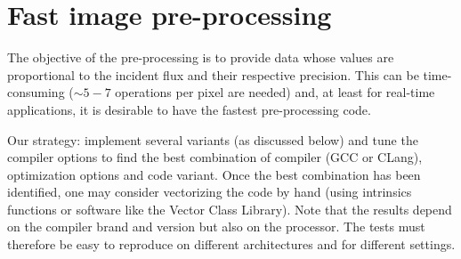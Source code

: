 \documentclass[10pt]{article}
\begin{document}
\section{Fast image pre-processing}

The objective of the pre-processing is to provide data whose values
are proportional to the incident flux and their respective precision.
This can be time-consuming ($\sim 5 - 7$ operations per pixel are
needed) and, at least for real-time applications, it is desirable to
have the fastest pre-processing code.

Our strategy: implement several variants (as discussed below) and tune
the compiler options to find the best combination of compiler (GCC or
CLang), optimization options and code variant.  Once the best
combination has been identified, one may consider vectorizing the code
by hand (using intrinsics functions or software like the Vector Class
Library).  Note that the results depend on the compiler brand and
version but also on the processor.  The tests must therefore be easy
to reproduce on different architectures and for different settings.
\end{document}
